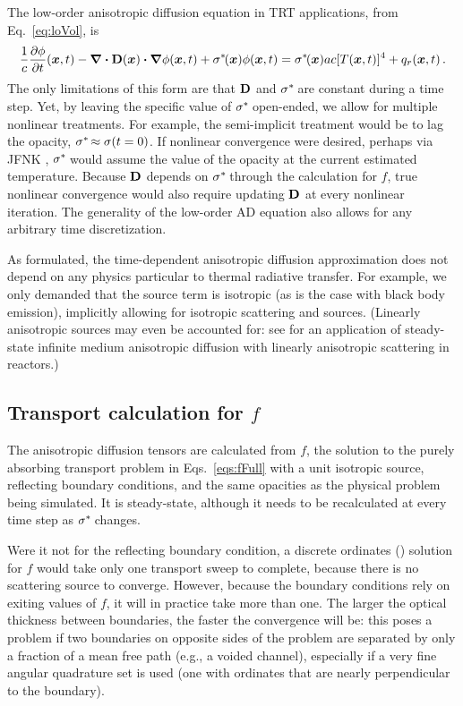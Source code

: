 The low-order anisotropic diffusion equation in TRT applications, from
Eq.~\eqref{eq:loVol}, is
\begin{equation*}
\frac{1}{c} \frac{\partial \phi}{\partial t} (\bm{x}, t)
  - \bm{\nabla} \bm{\cdot} \mathbf{D}(\bm{x}) \bm{\cdot} \bm{\nabla} \phi(\bm{x},t)
  + \sigma^{*\!}(\bm{x}) \phi(\bm{x}, t)
  = \sigma^{*\!}(\bm{x}) ac [T(\bm{x}, t)]^4 + q_{r}(\bm{x}, t)\,.
\end{equation*}
The only limitations of this form are that $\mathbf{D}$ and $\sigma^{*\!}$ are constant
during a time step.  Yet, by leaving the specific value of $\sigma^{*\!}$
open-ended, we allow for multiple nonlinear treatments. For example, the
semi-implicit treatment would be to lag the opacity, $\sigma^{*\!} \approx
\sigma(t=0)$. If nonlinear convergence were desired, perhaps via JFNK
\cite{Kno2004}, $\sigma^{*\!}$ would assume the value of the opacity at the current
estimated temperature. Because $\mathbf{D}$ depends on $\sigma^{*\!}$ through the
calculation for $f$, true nonlinear convergence would also require updating
$\mathbf{D}$ at every nonlinear iteration. The generality of the low-order AD
equation also allows for any arbitrary time discretization.

As formulated, the time-dependent anisotropic diffusion approximation does not
depend on any physics particular to thermal radiative transfer. For example, we
only demanded that the source term is isotropic (as is the case with black body
emission), implicitly allowing for isotropic scattering and sources. (Linearly
anisotropic sources may even be accounted for: see
\cite{Kel2010} for an application of steady-state infinite medium anisotropic
diffusion with linearly anisotropic scattering in reactors.)

\subsection{Transport calculation for \texorpdfstring{$f$}{f}}

The anisotropic diffusion tensors are calculated from $f$, the solution to the
purely absorbing transport problem in Eqs.~\eqref{eqs:fFull}  with a unit
isotropic source,
reflecting boundary conditions, and the same opacities as the physical problem
being simulated. It is steady-state, although it needs to be recalculated at
every time step as $\sigma^{*\!}$ changes.

Were it not for the reflecting boundary condition, a discrete ordinates (\SN)
solution for $f$ would take only one transport sweep to complete, because there
is no scattering source to converge. However, because the boundary conditions
rely on exiting values of $f$, it will in practice take more than one. The
larger the optical thickness between boundaries, the faster the convergence will
be: this poses a problem if
two boundaries on opposite sides of the problem are separated by only a
fraction of a mean free path (e.g., a voided channel), especially if a very fine
angular
quadrature set is used (one with ordinates that are nearly perpendicular to the
boundary).

